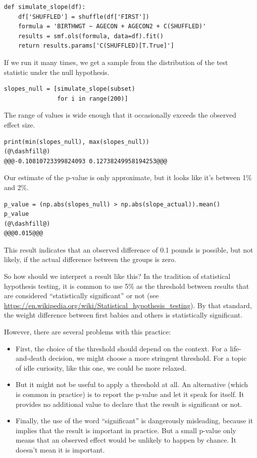 \begin{lstlisting}[]
def simulate_slope(df):
    df['SHUFFLED'] = shuffle(df['FIRST'])
    formula = 'BIRTHWGT ~ AGECON + AGECON2 + C(SHUFFLED)'
    results = smf.ols(formula, data=df).fit()
    return results.params['C(SHUFFLED)[T.True]']
\end{lstlisting}

If we run it many times, we get a sample from the distribution of the
test statistic under the null hypothesis.

\begin{lstlisting}[]
slopes_null = [simulate_slope(subset)
               for i in range(200)]
\end{lstlisting}

The range of values is wide enough that it occasionally exceeds the
observed effect size.

\begin{lstlisting}[]
print(min(slopes_null), max(slopes_null))
(@\dashfill@)
@@@-0.10810723399824093 0.12738249958194253@@@
\end{lstlisting}

Our estimate of the p-value is only approximate, but it looks like it's
between 1\% and 2\%.

\begin{lstlisting}[]
p_value = (np.abs(slopes_null) > np.abs(slope_actual)).mean()
p_value
(@\dashfill@)
@@@0.015@@@
\end{lstlisting}

This result indicates that an observed difference of 0.1 pounds is
possible, but not likely, if the actual difference between the groups is
zero.

So how should we interpret a result like this? In the tradition of
statistical hypothesis testing, it is common to use 5\% as the threshold
between results that are considered ``statistically significant'' or not
(see
\url{https://en.wikipedia.org/wiki/Statistical_hypothesis_testing}). By
that standard, the weight difference between first babies and others is
statistically significant.

However, there are several problems with this practice:

\begin{itemize}
\item
  First, the choice of the threshold should depend on the context. For a
  life-and-death decision, we might choose a more stringent threshold.
  For a topic of idle curiosity, like this one, we could be more
  relaxed.
\item
  But it might not be useful to apply a threshold at all. An alternative
  (which is common in practice) is to report the p-value and let it
  speak for itself. It provides no additional value to declare that the
  result is significant or not.
\item
  Finally, the use of the word ``significant'' is dangerously
  misleading, because it implies that the result is important in
  practice. But a small p-value only means that an observed effect would
  be unlikely to happen by chance. It doesn't mean it is important.
\end{itemize}

